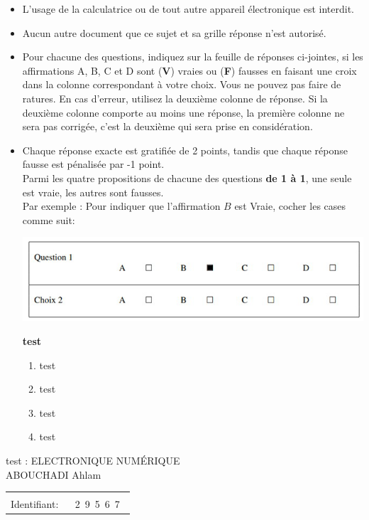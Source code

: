 \documentclass{book}%
\begin{document}
\begin{itemize}%
\item%
L'usage de la calculatrice ou de tout autre appareil électronique est interdit.%
\item%
Aucun autre document que ce sujet et sa grille réponse n'est autorisé.%
\item%
Pour chacune des questions, indiquez sur la feuille de réponses ci-jointes, si les affirmations A, B, C et D sont (\textbf{V}) vraies ou (\textbf{F}) fausses en faisant une croix dans la colonne correspondant à votre choix. Vous ne pouvez pas faire de ratures. En cas d'erreur, utilisez la deuxième colonne de réponse. Si la deuxième colonne comporte au moins une réponse, la première colonne ne sera pas corrigée, c'est la deuxième qui sera prise en considération.%
\item%
Chaque réponse exacte est gratifiée de 2 points, tandis que chaque réponse fausse est pénalisée par -1 point. \\ 	Parmi les quatre propositions de chacune des questions \textbf{de 1 à 1}, une seule est vraie, les autres sont fausses. \\ 	Par exemple : Pour indiquer que l'affirmation $B$ est Vraie, cocher les cases comme suit:  \\ \begin{center}	\includegraphics[scale=0.8]{reponses.png} \end{center}%
\thispagestyle{empty}%
\begin{exercise}%
\textbf{test }%
\begin{enumerate}[label=\textbf{\Alph*. }]%
\item%
test%
\item%
test%
\item%
test%
\item%
test%
\end{enumerate}%
\end{exercise}%
\end{itemize}%
\newpage%
\thispagestyle{empty}%
test : ELECTRONIQUE NUMÉRIQUE $\qquad \qquad \qquad \qquad \qquad \qquad \qquad \qquad$ ABOUCHADI Ahlam%
\begin{flushright}%
\begin{tabular}{|l|}%
\hline%
 \\%
\thispagestyle{empty}%
Identifiant: $\quad$ {\Large 2~9~5~6~7~}%
 \\%
\hline%
\end{tabular}%
\end{flushright}%
\end{document}
